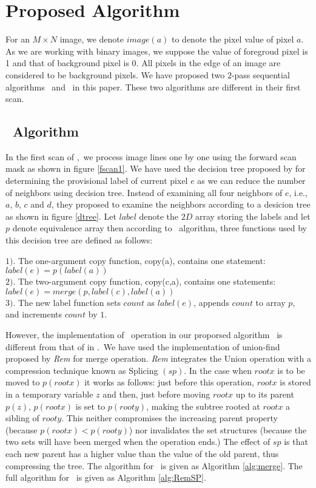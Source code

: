 \section{Proposed Algorithm}
\label{sec:proposed_algorithm}
For an $M \times N$ image, we denote $image(a)$ to denote the pixel value of pixel $a$. As we are working with
binary images, we suppose the value of foregroud pixel is 1 and that of background pixel is 0. All pixels in 
the edge of an image are considered to be background pixels. We have proposed two $2$-pass sequential algorithms
\remsp\ and \aremsp\ in this paper. These two algorithms are different in their
first scan.

\subsection{\remsp\ Algorithm}
In the first scan of \remsp,\ we process image lines one by one using the
forward scan mask as shown in figure \ref{fscan1}. We have used the decision 
tree proposed by \cite{Wu2009_LRPC} for determining the provisional label of current pixel
$e$ as we can reduce the number of neighbors using decision tree. Instead of
examining all four neighbors of $e$, i.e., $a$, $b$, $c$ and $d$, they proposed
to examine the neighbors according to a desicion tree as shown in figure \ref{dtree}.
 Let $label$ denote the $2D$ array storing the labels and let $p$ denote equivalence array 
 then according to \lrpc\ algorithm,
three functions used by this decision tree are defined as follows:

$1)$. The one-argument copy function, copy(a), contains one statement:
					$label(e) = p(label(a))$\\
$2)$. The two-argument copy function, copy(c,a), contains one statements:
				$label(e) = merge(p, label(c), label(a))$\\
$3)$. The new label function sets $count$ as $label(e)$, appends $count$ to array $p$, and increments $count$ by $1$.

However, the implementation of \merge\ operation in our proporsed algorithm
\remsp\ is different from that of in \lrpc.\
We have used the implementation of union-find proposed by {\em Rem}
\cite{Patwary2010_RemSP} for merge operation. {\em Rem} integrates the Union
operation with a compression technique known as Splicing $(sp)$. In the case when 
$rootx$ is to be moved to $p(rootx)$ it works as follows: just before this operation, 
$rootx$ is stored in a temporary variable $z$ and 
then, just before moving $rootx$ up to its parent $p(z)$, $p(rootx)$ is set to $p(rooty)$, 
making the subtree rooted at 
$rootx$ a sibling of $rooty$. This neither compromises the increasing parent property (because $p(rootx) < p(rooty)$) 
nor invalidates the set structures (because the two sets will have been merged when the operation ends.) The effect of $sp$
is that each new parent has a higher value than the value of the old parent, thus compressing the tree. The algorithm for
\merge\ is given as Algorithm \ref{alg:merge}. The full algorithm for \remsp\ is
given as Algorithm \ref{alg:RemSP}.

